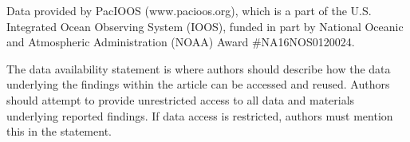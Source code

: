 \documentclass{ametsocV5}
\begin{document}






\acknowledgments
 Data provided by PacIOOS (www.pacioos.org), which is a part of the U.S. Integrated Ocean Observing System (IOOS), funded in part by National Oceanic and Atmospheric Administration (NOAA) Award \#NA16NOS0120024.


% 
%
\datastatement
The data availability statement is where authors should describe how the data underlying 
the findings within the article can be accessed and reused. Authors should attempt to 
provide unrestricted access to all data and materials underlying reported findings. 
If data access is restricted, authors must mention this in the statement.
\end{document}
